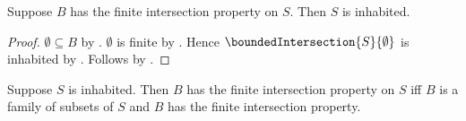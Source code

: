 \begin{proposition}\label{hosted_fip_carrier_inhabited}
    Suppose $B$ has the finite intersection property on $S$.
    Then $S$ is inhabited.
\end{proposition}
\begin{proof}
    $\emptyset\subseteq B$ by .
    $\emptyset$ is finite by .
    Hence $\boundedIntersection{S}{\emptyset}$ is inhabited
        by .
    Follows by .
\end{proof}

\begin{theorem}\label{hosted_fip_iff_ambient_free_fip}
    Suppose $S$ is inhabited.
    Then $B$ has the finite intersection property on $S$ iff
        $B$ is a family of subsets of $S$ and
        $B$ has the finite intersection property.
\end{theorem}
